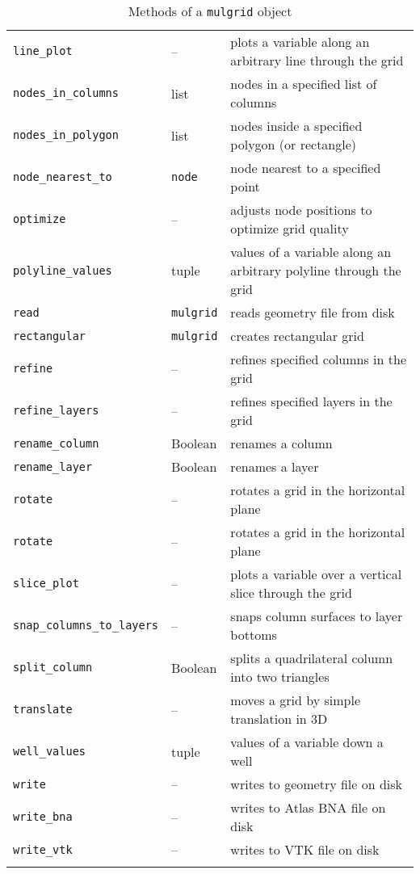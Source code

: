 \begin{center}
\begin{longtable}{|l|l|p{70mm}|}
  \texttt{line\_plot} & -- & plots a variable along an arbitrary line through the grid\\
  \texttt{nodes\_in\_columns} & list & nodes in a specified list of columns\\ 
  \texttt{nodes\_in\_polygon} & list & nodes inside a specified polygon (or rectangle)\\ 
  \texttt{node\_nearest\_to} & \texttt{node} & node nearest to a specified point\\ 
  \texttt{optimize} & -- & adjusts node positions to optimize grid quality\\
  \texttt{polyline\_values} & tuple & values of a variable along an arbitrary polyline through the grid\\
  \texttt{read} & \texttt{mulgrid} & reads geometry file from disk\\
  \texttt{rectangular} & \texttt{mulgrid} & creates rectangular grid\\
  \texttt{refine} & -- & refines specified columns in the grid\\
  \texttt{refine\_layers} & -- & refines specified layers in the grid\\
  \texttt{rename\_column} & Boolean & renames a column\\
  \texttt{rename\_layer} & Boolean & renames a layer\\
  \texttt{rotate} & -- & rotates a grid in the horizontal plane\\
  \texttt{rotate} & -- & rotates a grid in the horizontal plane\\
  \texttt{slice\_plot} & -- & plots a variable over a vertical slice through the grid\\
  \texttt{snap\_columns\_to\_layers} & -- & snaps column surfaces to layer bottoms\\
  \texttt{split\_column} & Boolean & splits a quadrilateral column into two triangles\\ 
  \texttt{translate} & -- & moves a grid by simple translation in 3D\\
  \texttt{well\_values} & tuple & values of a variable down a well\\
  \texttt{write} & -- & writes to geometry file on disk\\
  \texttt{write\_bna} & -- & writes to Atlas BNA file on disk\\ 
  \texttt{write\_vtk} &  -- & writes to VTK file on disk\\
  \hline
  \caption{Methods of a \texttt{mulgrid} object}
  \label{tb:mulgrid_methods}
\end{longtable}
\end{center}

